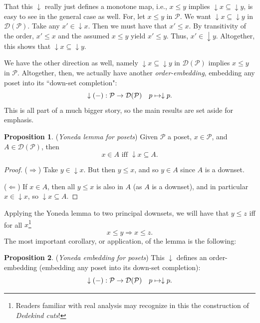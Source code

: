 \documentclass[11pt]{book}
\theoremstyle{definition}
\theoremstyle{definition}
\theoremstyle{definition}
\newtheorem{proposition}{Proposition}[section]
\theoremstyle{theorem}
\theoremstyle{definition}
\begin{document}
 That this $\downarrow$ really just defines a monotone map, i.e., $x \leq y$ implies $\downarrow x \subseteq  \downarrow y$, is easy to see in the general case as well. For, let $x \leq y$ in $\mathcal{P}$. We want $\downarrow x \subseteq  \downarrow y$ in $\mathcal{D}(\mathcal{P})$. Take any $x' \in \downarrow x$. Then we must have that $x' \leq x$. By transitivity of the order, $x' \leq x$ and the assumed $x \leq y$ yield $x' \leq y$. Thus, $x' \in \downarrow y$. Altogether, this shows that $\downarrow x \subseteq  \downarrow y$. \par 
 We have the other direction as well, namely $\downarrow x \subseteq  \downarrow y$ in $\mathcal{D}(\mathcal{P})$ implies $x \leq y$ in $\mathcal{P}$. Altogether, then, we actually have another \textit{order-embedding}, embedding any poset into its ``down-set completion":
\begin{equation}
\downarrow(\--): \mathcal{P} \rightarrow \mathcal{D}(\mathcal{P}) \hspace*{1em}
p \mapsto \downarrow p . 
\end{equation}  
This is all part of a much bigger story, so the main results are set aside for emphasis.
\begin{proposition}
	(\textit{Yoneda lemma for posets})  Given $\mathcal{P}$ a poset, $x \in \mathcal{P}$, and $A \in \mathcal{D}(\mathcal{P})$, then 
	\begin{equation*}
	x \in A \text{ iff } \downarrow x \subseteq  A. 
	\end{equation*}
\end{proposition}
\begin{proof}
	($\Rightarrow$) Take $y \in \downarrow x$. But then $y \leq x$, and so $y \in A$ since $A$ is a downset. \par \noindent 
	($\Leftarrow$) If $x \in A$, then all $y \leq x$ is also in $A$ (as $A$ is a downset), and in particular $x \in \downarrow x$, so $\downarrow x \subseteq  A$.
\end{proof} \noindent 
Applying the Yoneda lemma to two principal downsets, we will have that $y \leq z$ iff for all $x$\footnote{Readers familiar with real analysis may recognize in this the construction of \textit{Dedekind cuts}!}
\begin{equation*}
x \leq y \Rightarrow x \leq z. 
\end{equation*} 
The most important corollary, or application, of the lemma is the following: 
\begin{proposition}
	(\textit{Yoneda embedding for posets})  This $\downarrow$ defines an order-embedding (embedding any poset into its down-set completion): 
	\begin{equation}
	\downarrow(\--): \mathcal{P} \rightarrow \mathcal{D}(\mathcal{P}) \hspace*{1em}
	p \mapsto \downarrow p.  
	\end{equation}  
\end{proposition}
\end{document}

